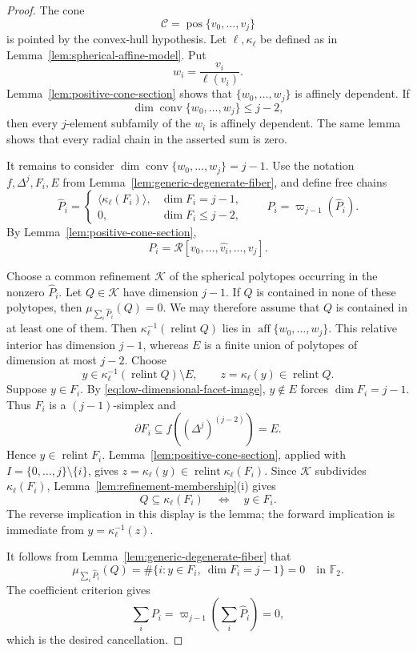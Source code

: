 \documentclass[10pt,a4paper]{amsart}
\DeclareMathOperator{\conv}{conv}
\DeclareMathOperator{\pos}{pos}
\DeclareMathOperator{\relint}{relint}
\newcommand{\F}{\mathbb F_2}
\begin{document}
\begin{proof}
The cone
\[
 \mathcal C=\pos\{v_0,\ldots,v_j\}
\]
is pointed by the convex-hull hypothesis.  Let
\(\ell,\kappa_\ell\) be defined as in
Lemma~\ref{lem:spherical-affine-model}.  Put
\[
 w_i=\frac{v_i}{\ell(v_i)}.
\]
Lemma~\ref{lem:positive-cone-section} shows that
\(\{w_0,\ldots,w_j\}\) is affinely dependent.  If
\[
 \dim\conv\{w_0,\ldots,w_j\}\leq j-2,
\]
then every \(j\)-element subfamily of the \(w_i\) is affinely
dependent.  The same lemma shows that every radial chain in the
asserted sum is zero.

It remains to consider
\(\dim\conv\{w_0,\ldots,w_j\}=j-1\).  Use the notation
\(f,\Delta^j,F_i,E\) from
Lemma~\ref{lem:generic-degenerate-fiber}, and define free chains
\[
 \widehat P_i=
 \begin{cases}
  \langle\kappa_\ell(F_i)\rangle,&\dim F_i=j-1,\\
  0,&\dim F_i\leq j-2,
 \end{cases}
 \qquad
 P_i=\varpi_{j-1}(\widehat P_i).
\]
By Lemma~\ref{lem:positive-cone-section},
\[
 P_i=\mathcal R[v_0,\ldots,\widehat{v_i},\ldots,v_j].
\]

Choose a common refinement \(\mathcal K\) of the spherical polytopes
occurring in the nonzero \(\widehat P_i\).  Let
\(Q\in\mathcal K\) have dimension \(j-1\).  If \(Q\) is contained in
none of these polytopes, then
\(\mu_{\sum_i\widehat P_i}(Q)=0\).  We may therefore assume that
\(Q\) is contained in at least one of them.  Then
\(\kappa_\ell^{-1}(\relint Q)\) lies in
\(\operatorname{aff}\{w_0,\ldots,w_j\}\).  This relative interior has
dimension \(j-1\), whereas \(E\) is a finite union of polytopes of
dimension at most \(j-2\).  Choose
\[
 y\in\kappa_\ell^{-1}(\relint Q)\setminus E,
 \qquad
 z=\kappa_\ell(y)\in\relint Q.
\]
Suppose \(y\in F_i\).  By
\eqref{eq:low-dimensional-facet-image}, \(y\notin E\) forces
\(\dim F_i=j-1\).  Thus \(F_i\) is a \((j-1)\)-simplex and
\[
 \partial F_i\subseteq f((\Delta^j)^{(j-2)})=E.
\]
Hence \(y\in\relint F_i\).
Lemma~\ref{lem:positive-cone-section}, applied with
\(I=\{0,\ldots,j\}\setminus\{i\}\), gives
\(z=\kappa_\ell(y)\in\relint\kappa_\ell(F_i)\).
Since \(\mathcal K\) subdivides
\(\kappa_\ell(F_i)\), Lemma~\ref{lem:refinement-membership}(i) gives
\[
 Q\subseteq\kappa_\ell(F_i)
 \quad\Longleftrightarrow\quad
 y\in F_i.
\]
The reverse implication in this display is the lemma; the forward
implication is immediate from \(y=\kappa_\ell^{-1}(z)\).

It follows from Lemma~\ref{lem:generic-degenerate-fiber} that
\[
 \mu_{\sum_i\widehat P_i}(Q)
 =
 \#\{i:y\in F_i,\ \dim F_i=j-1\}=0
 \quad\text{in }\F.
\]
The coefficient criterion gives
\[
 \sum_iP_i=\varpi_{j-1}\!\left(\sum_i\widehat P_i\right)=0,
\]
which is the desired cancellation.
\end{proof}
\end{document}
